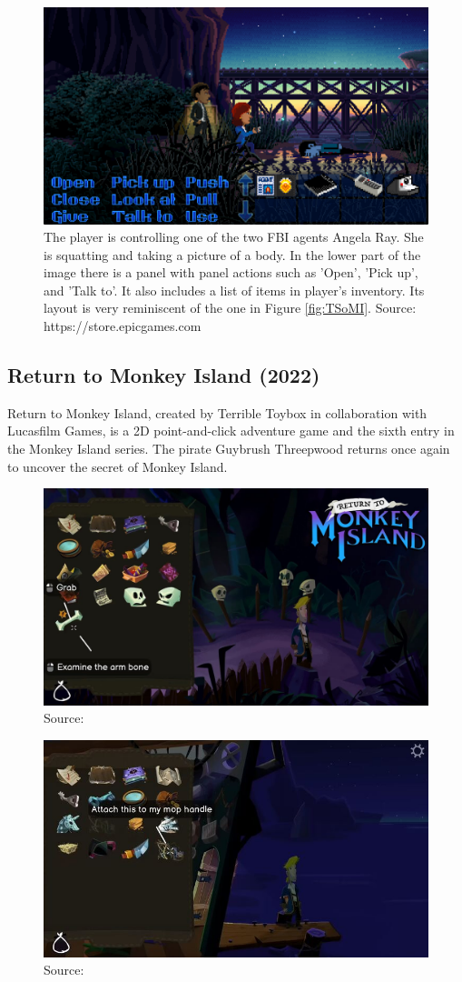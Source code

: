\begin{figure}[H]
\centering
\includegraphics[width=1.\linewidth]{img/TWP.png}
\caption{The player is controlling one of the two FBI agents Angela Ray. She is squatting and taking a picture of a body. In the lower part of the image there is a panel with panel actions such as 'Open', 'Pick up', and 'Talk to'. It also includes a list of items in player's inventory. Its layout is very reminiscent of the one in Figure \ref{fig:TSoMI}. Source: https://store.epicgames.com \cite{epic:TWP}}
\label{fig:TWP}
\end{figure}



\subsection{Return to Monkey Island (2022)}
Return to Monkey Island, created by Terrible Toybox in collaboration with Lucasfilm Games, is a 2D point-and-click adventure game and the sixth entry in the Monkey Island series. The pirate Guybrush Threepwood returns once again to uncover the secret of Monkey Island\cite{McCaffrey2022}.


\begin{figure}[H]
\centering
\includegraphics[width=.7\linewidth]{img/RtMI1.png}
\caption{Source:  \cite{}}
\label{fig:RtMI1}
\end{figure}

\begin{figure}[H]
\centering
\includegraphics[width=.7\linewidth]{img/RtMI2.png}
\caption{Source:  \cite{}}
\label{fig:RtMI2}
\end{figure}
